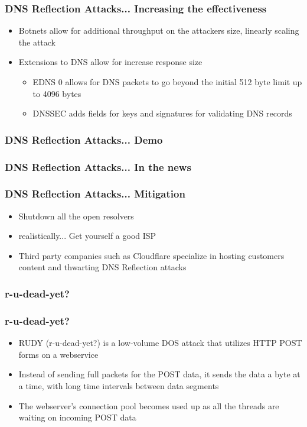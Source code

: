 \documentclass{beamer}
\begin{document}
\begin{frame}
	\frametitle{DNS Reflection Attacks... Increasing the effectiveness}
	\begin{itemize}
		\item Botnets allow for additional throughput on the attackers size,
			linearly scaling the attack
		\item Extensions to DNS allow for increase response size
			\begin{itemize}
				\item EDNS 0 allows for DNS packets to go beyond the initial 512 byte
					limit up to 4096 bytes
				\item DNSSEC adds fields for keys and signatures for validating DNS
					records
			\end{itemize}
	\end{itemize}
\end{frame}


\begin{frame}
	\frametitle{DNS Reflection Attacks... Demo}
\end{frame}

\begin{frame}
	\frametitle{DNS Reflection Attacks... In the news}
\end{frame}

\begin{frame}
	\frametitle{DNS Reflection Attacks... Mitigation}
	\begin{itemize}
		\item Shutdown all the open resolvers
			\pause
		\item realistically...
			\pause
			Get yourself a good ISP 
			\pause
		\item Third party companies such as Cloudflare specialize in hosting customers
			content and thwarting DNS Reflection attacks
	\end{itemize}
\end{frame}

\begin{frame}
	\frametitle{r-u-dead-yet?}
\end{frame}

\begin{frame}
	\frametitle{r-u-dead-yet?}
	\begin{itemize}
		\item RUDY (r-u-dead-yet?) is a low-volume DOS attack that utilizes HTTP
			POST forms on a webservice
		\item Instead of sending full packets for the POST data, it sends the data a
			byte at a time, with long time intervals between data segments
		\item The webserver's connection pool becomes used up as all the threads are
			waiting on incoming POST data
	\end{itemize}
\end{frame}
\end{document}
